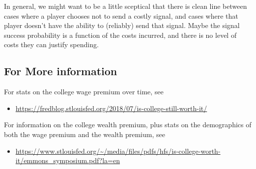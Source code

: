\documentclass[11pt,]{article}
\providecommand{\tightlist}{%
  \setlength{\itemsep}{0pt}\setlength{\parskip}{0pt}}
\begin{document}
In general, we might want to be a little sceptical that there is clean
line between cases where a player chooses not to send a costly signal,
and cases where that player doesn't have the ability to (reliably) send
that signal. Maybe the signal success probability is a function of the
costs incurred, and there is no level of costs they can justify
spending.

\hypertarget{for-more-information}{%
\subsection{For More information}\label{for-more-information}}

For stats on the college wage premium over time, see

\begin{itemize}
\tightlist
\item
  \url{https://fredblog.stlouisfed.org/2018/07/is-college-still-worth-it/}
\end{itemize}

For information on the college wealth premium, plus stats on the
demographics of both the wage premium and the wealth premium, see

\begin{itemize}
\tightlist
\item
  \url{https://www.stlouisfed.org/~/media/files/pdfs/hfs/is-college-worth-it/emmons_symposium.pdf?la=en}
\end{itemize}
\end{document}
